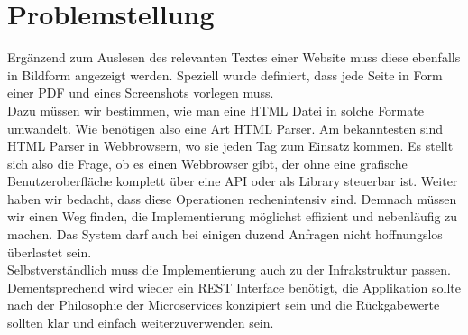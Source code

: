 \section{Problemstellung}
Ergänzend zum Auslesen des relevanten Textes einer Website muss diese ebenfalls in Bildform angezeigt werden. Speziell wurde definiert, dass jede Seite in Form einer PDF und eines Screenshots vorlegen muss. \\
Dazu müssen wir bestimmen, wie man eine HTML Datei in solche Formate umwandelt. Wie benötigen also eine Art HTML Parser. Am bekanntesten sind HTML Parser in Webbrowsern, wo sie jeden Tag zum Einsatz kommen. Es stellt sich also die Frage, ob es einen Webbrowser gibt, der ohne eine grafische Benutzeroberfläche komplett über eine API oder als Library steuerbar ist.
Weiter haben wir bedacht, dass diese Operationen rechenintensiv sind. Demnach müssen wir einen Weg finden, die Implementierung möglichst effizient und nebenläufig zu machen. Das System darf auch bei einigen duzend Anfragen nicht hoffnungslos überlastet sein. \\
Selbstverständlich muss die Implementierung auch zu der Infrakstruktur passen. Dementsprechend wird wieder ein REST Interface benötigt, die Applikation sollte nach der Philosophie der Microservices konzipiert sein und die Rückgabewerte sollten klar und einfach weiterzuverwenden sein.